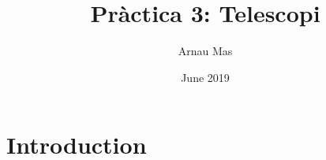 \documentclass{article}
\title{Pràctica 3: Telescopi}
\author{Arnau Mas}
\date{June 2019}
\begin{document}
\maketitle

\section{Introduction}
\end{document}
